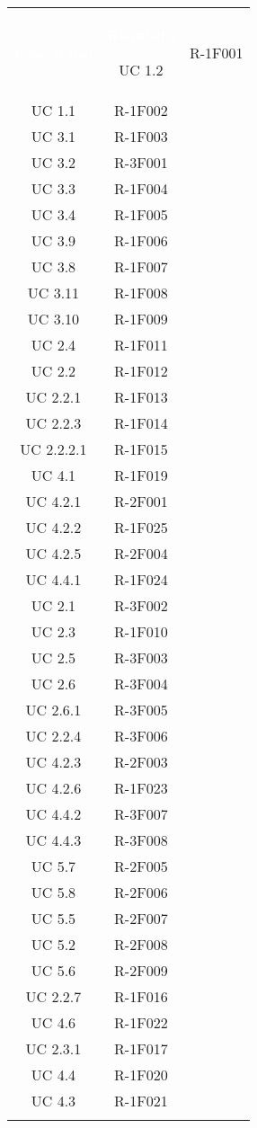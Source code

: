 \begin{tabularx}{\textwidth}{c|c}
	
	\rowcolor{greySWEight}
	\textcolor{white}{\textbf{Caso d'uso}} &
	\textcolor{white}{\textbf{Requisito}}\endhead

 	UC 1.2 & R-1F001\\
	UC 1.1 & R-1F002\\
	UC 3.1 & R-1F003\\
	UC 3.2 & R-3F001\\
	UC 3.3 & R-1F004\\
	UC 3.4 & R-1F005\\
	UC 3.9 & R-1F006\\
	UC 3.8 & R-1F007\\
	UC 3.11 & R-1F008\\
	UC 3.10 & R-1F009\\
	UC 2.4 & R-1F011\\
	UC 2.2 & R-1F012\\
	UC 2.2.1 & R-1F013\\
	UC 2.2.3 & R-1F014\\
	UC 2.2.2.1 & R-1F015\\
	UC 4.1 & R-1F019\\
	UC 4.2.1 & R-2F001\\
	UC 4.2.2 & R-1F025\\
	UC 4.2.5 & R-2F004\\
	UC 4.4.1 & R-1F024\\
	UC 2.1 & R-3F002\\
	UC 2.3 & R-1F010\\
	UC 2.5 & R-3F003\\
	UC 2.6 & R-3F004\\
	UC 2.6.1 & R-3F005\\
	UC 2.2.4 & R-3F006\\
	UC 4.2.3 & R-2F003\\
	UC 4.2.6 & R-1F023\\
	UC 4.4.2 & R-3F007\\
	UC 4.4.3 & R-3F008\\
	UC 5.7 & R-2F005\\
	UC 5.8 & R-2F006\\
	UC 5.5 & R-2F007\\
	UC 5.2 & R-2F008\\
	UC 5.6 & R-2F009\\
	UC 2.2.7 & R-1F016\\
	UC 4.6   & R-1F022\\
	UC 2.3.1 & R-1F017\\
	UC 4.4   & R-1F020\\
	UC 4.3     & R-1F021\\
	
	\caption{Tabella tracciamento casi d'uso-requisiti} \label{tab:tabellafonterequisiti}
\end{tabularx}